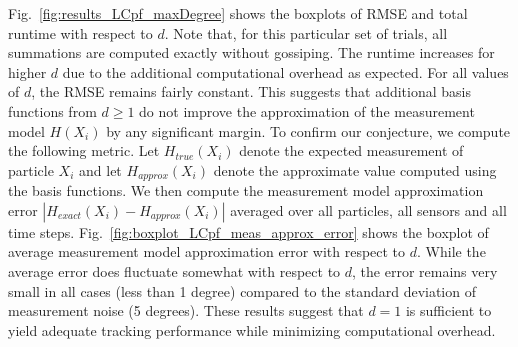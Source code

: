 \documentclass[10pt,letterpaper,final]{article}
\begin{document}
Fig.~\ref{fig:results_LCpf_maxDegree} shows the boxplots of RMSE and total runtime with respect to $d$. Note that, for this particular set of trials, all summations are computed exactly without gossiping. The runtime increases for higher $d$ due to the additional computational overhead as expected. For all values of $d$, the RMSE remains fairly constant. This suggests that additional basis functions from $d\geq 1$ do not improve the approximation of the measurement model $H(X_i)$ by any significant margin. To confirm our conjecture, we compute the following metric. Let $H_{true}(X_i)$ denote the expected measurement of particle $X_i$ and let $H_{approx}(X_i)$ denote the approximate value computed using the basis functions. We then compute the measurement model approximation error $|H_{exact}(X_i)-H_{approx}(X_i)|$ averaged over all particles, all sensors and all time steps. Fig.~\ref{fig:boxplot_LCpf_meas_approx_error} shows the boxplot of average measurement model approximation error with respect to $d$. While the average error does fluctuate somewhat with respect to $d$, the error remains very small in all cases (less than 1 degree) compared to the standard deviation of measurement noise (5 degrees). These results suggest that $d=1$ is sufficient to yield adequate tracking performance while minimizing computational overhead. 
\end{document}
